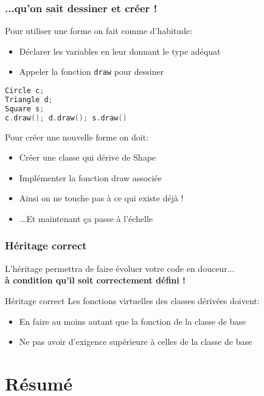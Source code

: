\documentclass{beamer}
\begin{document}
\begin{frame}[fragile=singleslide,shrink=20]
\frametitle{...qu'on sait dessiner et créer !}

\begin{block}{Pour utiliser une forme on fait comme d'habitude:}
\begin{itemize}
\item{Déclarer les variables en leur donnant le type adéquat}
\item{Appeler la fonction \texttt{draw} pour dessiner}
\end{itemize}
\begin{lstlisting}[language=c++]
Circle c;
Triangle d;
Square s;
c.draw(); d.draw(); s.draw()
\end{lstlisting}
\end{block}

\begin{block}{Pour créer une nouvelle forme on doit:}
\begin{itemize}
\item{Créer une classe qui dérive de Shape}
\item{Implémenter la fonction draw associée}
\item{Ainsi on ne touche pas à ce qui existe déjà !}
\item{...Et maintenant ça passe à l'échelle}
\end{itemize}
\end{block}
\end{frame}
  
\begin{frame}
\frametitle{Héritage correct}
L'héritage permettra de faire évoluer votre code en douceur... \\ 
\textbf{à condition qu'il soit correctement défini !}
  
\begin{block}{Héritage correct}
Les fonctions virtuelles des classes dérivées doivent:
\begin{itemize}
\item{En faire au moins autant que la fonction de la classe de base}
\item{Ne pas avoir d'exigence supérieure à celles de la classe de base}
\end{itemize}
\end{block}
\end{frame}

\section{Résumé}
\end{document}
